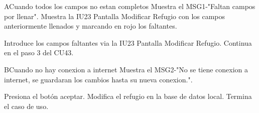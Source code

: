 \begin{UCtrayectoriaA}{A}{Cuando todos los campos no estan completos}
	\UCpaso Muestra el MSG1-"Faltan campos por llenar".
	\UCpaso Muestra la IU23 Pantalla Modificar Refugio con los campos anteriormente llenados y marcando en rojo los faltantes.
	\item\UCactor Introduce los campos faltantes via la IU23 Pantalla Modificar Refugio.
	\UCpaso Continua en el paso 3 del CU43.
\end{UCtrayectoriaA}

\begin{UCtrayectoriaA}{B}{Cuando no hay conexion a internet}
	\UCpaso Muestra el MSG2-"No se tiene conexion a internet, se guardaran los cambios hasta su nueva conexion.".
	\item\UCactor Presiona el botón aceptar.
	\UCpaso Modifica el refugio en la base de datos local.	
	\UCpaso[] Termina el caso de uso.
\end{UCtrayectoriaA}